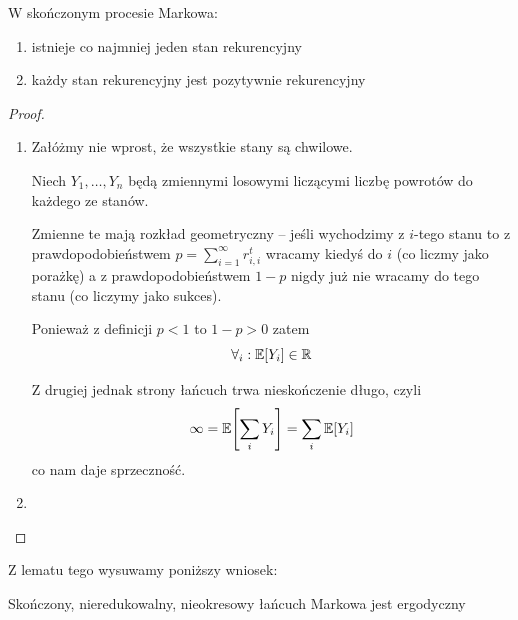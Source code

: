 \begin{lemma}
    W skończonym procesie Markowa:
    \begin{enumerate}
        \item istnieje co najmniej jeden stan rekurencyjny
        \item każdy stan rekurencyjny jest pozytywnie rekurencyjny
    \end{enumerate}
    
\end{lemma}
\begin{proof} \( \) \\
    \begin{enumerate}
        \item Załóżmy nie wprost, że wszystkie stany są chwilowe.
        
            Niech \( Y_1, \dots, Y_n \) będą zmiennymi losowymi liczącymi liczbę powrotów do każdego ze stanów.
            
            Zmienne te mają rozkład geometryczny -- jeśli wychodzimy z \(i\)-tego stanu to z prawdopodobieństwem \(p = \sum_{i = 1}^\infty r_{i, i}^t \) wracamy kiedyś do \( i \) (co liczmy jako porażkę) a z prawdopodobieństwem \( 1 - p \) nigdy już nie wracamy do tego stanu (co liczymy jako sukces).
            
            Ponieważ z definicji \( p < 1 \) to \( 1 - p > 0 \)
            zatem
            \[
                \forall_i : \expected{Y_i} \in \real
            \]
            
            Z drugiej jednak strony łańcuch trwa nieskończenie długo, czyli
            \[
                \infty = \expected{\sum_i Y_i} = \sum_i \expected{Y_i}
            \]
            co nam daje sprzeczność.
        
        \item 
        
    \end{enumerate}
\end{proof}

Z lematu tego wysuwamy poniższy wniosek:
\begin{lemma}
    Skończony, nieredukowalny, nieokresowy łańcuch Markowa jest ergodyczny
\end{lemma}

